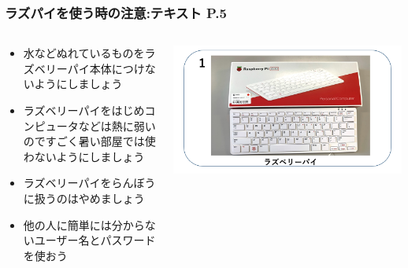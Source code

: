 \documentclass[dvipdfmx]{beamer}
\begin{document}
\begin{frame}[fragile]
	\frametitle{ラズパイを使う時の注意:テキスト P.5~~~}
	\begin{columns}[b]
		\begin{column}{0.8\textwidth}
				\begin{itemize}
					\item 水などぬれているものをラズベリーパイ本体につけないようにしましょう
					\item ラズベリーパイをはじめコンピュータなどは熱に弱いのですごく暑い部屋では使わないようにしましょう
					\item ラズベリーパイをらんぼうに扱うのはやめましょう
					\item 他の人に簡単には分からないユーザー名とパスワードを使おう
				\end{itemize}
				\end{column}
		\begin{column}{0.2\textwidth}
	 \includegraphics[width=\textwidth]{textbook-img009-2023.png}
				\end{column}
				\end{columns}

\end{frame}
\end{document}
